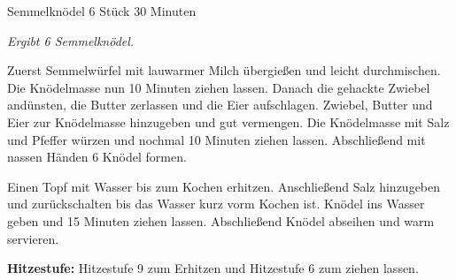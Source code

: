\begin{recipe}{Semmelknödel} {6 Stück} {30 Minuten}

  \freeform
  \textit{Ergibt 6 Semmelknödel.}


  Zuerst Semmelwürfel mit lauwarmer Milch übergießen und leicht durchmischen.
  Die Knödelmasse nun 10 Minuten ziehen lassen.
  Danach die gehackte Zwiebel andünsten, die Butter zerlassen und die Eier aufschlagen.
  Zwiebel, Butter und Eier zur Knödelmasse hinzugeben und gut vermengen.
  Die Knödelmasse mit Salz und Pfeffer würzen und nochmal 10 Minuten ziehen lassen.
  Abschließend mit nassen Händen 6 Knödel formen.

  \newstep
  Einen Topf mit Wasser bis zum Kochen erhitzen.
  Anschließend Salz hinzugeben und zurückschalten bis das Wasser kurz vorm Kochen ist.
  Knödel ins Wasser geben und 15 Minuten ziehen lassen.
  Abschließend Knödel abseihen und warm servieren. 

  \freeform
  \hrulefill

  \freeform
  \textbf{Hitzestufe:}
  Hitzestufe 9 zum Erhitzen und Hitzestufe 6 zum ziehen lassen.

\end{recipe}
